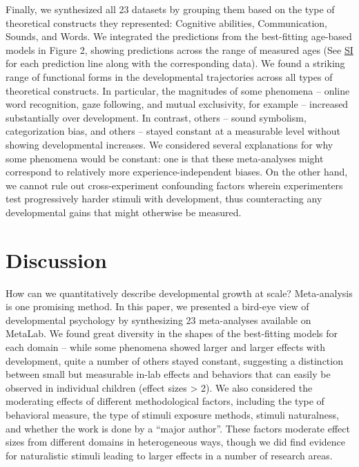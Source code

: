 \documentclass[10pt, letterpaper]{article}
\begin{document}
Finally, we synthesized all 23 datasets by grouping them based on the
type of theoretical constructs they represented: Cognitive abilities,
Communication, Sounds, and Words. We integrated the predictions from the
best-fitting age-based models in Figure 2, showing predictions across
the range of measured ages (See
\href{https://anonymous.4open.science/r/metalab_CogSci2023-7857/writing/SI.pdf}{SI}
for each prediction line along with the corresponding data). We found a
striking range of functional forms in the developmental trajectories
across all types of theoretical constructs. In particular, the
magnitudes of some phenomena -- online word recognition, gaze following,
and mutual exclusivity, for example -- increased substantially over
development. In contrast, others -- sound symbolism, categorization
bias, and others -- stayed constant at a measurable level without
showing developmental increases. We considered several explanations for
why some phenomena would be constant: one is that these meta-analyses
might correspond to relatively more experience-independent biases. On
the other hand, we cannot rule out cross-experiment confounding factors
wherein experimenters test progressively harder stimuli with
development, thus counteracting any developmental gains that might
otherwise be measured.

\hypertarget{discussion}{%
\section{Discussion}\label{discussion}}

How can we quantitatively describe developmental growth at scale?
Meta-analysis is one promising method. In this paper, we presented a
bird-eye view of developmental psychology by synthesizing 23
meta-analyses available on MetaLab. We found great diversity in the
shapes of the best-fitting models for each domain -- while some
phenomena showed larger and larger effects with development, quite a
number of others stayed constant, suggesting a distinction between small
but measurable in-lab effects and behaviors that can easily be observed
in individual children (effect sizes \textgreater{} 2). We also
considered the moderating effects of different methodological factors,
including the type of behavioral measure, the type of stimuli exposure
methods, stimuli naturalness, and whether the work is done by a ``major
author''. These factors moderate effect sizes from different domains in
heterogeneous ways, though we did find evidence for naturalistic stimuli
leading to larger effects in a number of research areas.
\end{document}
